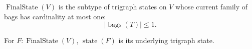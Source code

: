 \(\operatorname{FinalState}(V)\) is the subtype of trigraph states on \(V\)
whose current family of bags has cardinality at most one:
\[
  |\operatorname{bags}(T)|\le 1.
\]

For \(F:\operatorname{FinalState}(V)\), \(\operatorname{state}(F)\) is its
underlying trigraph state.
